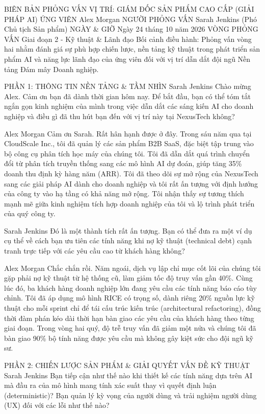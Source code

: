 BIÊN BẢN PHỎNG VẤN
VỊ TRÍ: GIÁM ĐỐC SẢN PHẨM CAO CẤP (GIẢI PHÁP AI)
ỨNG VIÊN
Alex Morgan
NGƯỜI PHỎNG VẤN
Sarah Jenkins (Phó Chủ tịch Sản phẩm)
NGÀY \& GIỜ
Ngày 24 tháng 10 năm 2026
VÒNG PHỎNG VẤN
Giai đoạn 2 - Kỹ thuật \& Lãnh đạo
Bối cảnh điều hành: Phỏng vấn vòng hai nhằm đánh giá sự phù hợp chiến lược, nền tảng kỹ thuật trong phát triển sản phẩm AI và năng lực lãnh đạo của ứng viên đối với vị trí dẫn dắt đội ngũ Nền tảng Đám mây Doanh nghiệp.

PHẦN 1: THÔNG TIN NỀN TẢNG \& TẦM NHÌN
Sarah Jenkins
Chào mừng Alex. Cảm ơn bạn đã dành thời gian hôm nay. Để bắt đầu, bạn có thể tóm tắt ngắn gọn kinh nghiệm của mình trong việc dẫn dắt các sáng kiến AI cho doanh nghiệp và điều gì đã thu hút bạn đến với vị trí này tại NexusTech không?

Alex Morgan
Cảm ơn Sarah. Rất hân hạnh được ở đây. Trong sáu năm qua tại CloudScale Inc., tôi đã quản lý các sản phẩm B2B SaaS, đặc biệt tập trung vào bộ công cụ phân tích học máy của chúng tôi. Tôi đã dẫn dắt quá trình chuyển đổi từ phân tích truyền thống sang các mô hình AI dự đoán, giúp tăng 35\% doanh thu định kỳ hàng năm (ARR). Tôi đã theo dõi sự mở rộng của NexusTech sang các giải pháp AI dành cho doanh nghiệp và tôi rất ấn tượng với định hướng của công ty vào hạ tầng có khả năng mở rộng. Tôi nhận thấy sự tương thích mạnh mẽ giữa kinh nghiệm tích hợp doanh nghiệp của tôi và lộ trình phát triển của quý công ty.

Sarah Jenkins
Đó là một thành tích rất ấn tượng. Bạn có thể đưa ra một ví dụ cụ thể về cách bạn ưu tiên các tính năng khi nợ kỹ thuật (technical debt) cạnh tranh trực tiếp với các yêu cầu cao từ khách hàng không?

Alex Morgan
Chắc chắn rồi. Năm ngoái, dịch vụ lập chỉ mục cốt lõi của chúng tôi gặp phải nợ kỹ thuật từ hệ thống cũ, làm giảm tốc độ truy vấn gần 40\%. Cùng lúc đó, ba khách hàng doanh nghiệp lớn đang yêu cầu các tính năng báo cáo tùy chỉnh. Tôi đã áp dụng mô hình RICE có trọng số, dành riêng 20\% nguồn lực kỹ thuật cho mỗi sprint chỉ để tái cấu trúc kiến trúc (architectural refactoring), đồng thời đàm phán kéo dài thời hạn bàn giao các yêu cầu của khách hàng theo từng giai đoạn. Trong vòng hai quý, độ trễ truy vấn đã giảm một nửa và chúng tôi đã bàn giao 90\% bộ tính năng được yêu cầu mà không gây kiệt sức cho đội ngũ kỹ sư.

PHẦN 2: CHIẾN LƯỢC SẢN PHẨM \& GIẢI QUYẾT VẤN ĐỀ KỸ THUẬT
Sarah Jenkins
Bạn tiếp cận như thế nào khi thiết kế các tính năng dựa trên AI mà đầu ra của mô hình mang tính xác suất thay vì quyết định luận (deterministic)? Bạn quản lý kỳ vọng của người dùng và trải nghiệm người dùng (UX) đối với các lỗi như thế nào?

